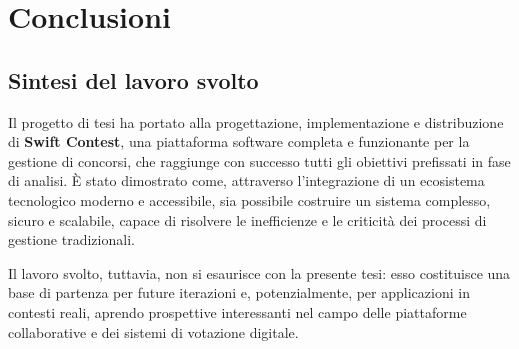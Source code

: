 
\chapter{Conclusioni}\label{ch:conclusioni}

\section{Sintesi del lavoro svolto}\label{sec:sintesi-del-lavoro-svolto}
Il progetto di tesi ha portato alla progettazione, implementazione e distribuzione di \textbf{Swift Contest}, una piattaforma software completa e funzionante per la gestione di concorsi, che raggiunge con successo tutti gli obiettivi prefissati in fase di analisi.
È stato dimostrato come, attraverso l'integrazione di un ecosistema tecnologico moderno e accessibile, sia possibile costruire un sistema complesso, sicuro e scalabile, capace di risolvere le inefficienze e le criticità dei processi di gestione tradizionali.

Il lavoro svolto, tuttavia, non si esaurisce con la presente tesi: esso costituisce una base di partenza per future iterazioni e, potenzialmente, per applicazioni in contesti reali, aprendo prospettive interessanti nel campo delle piattaforme collaborative e dei sistemi di votazione digitale.

